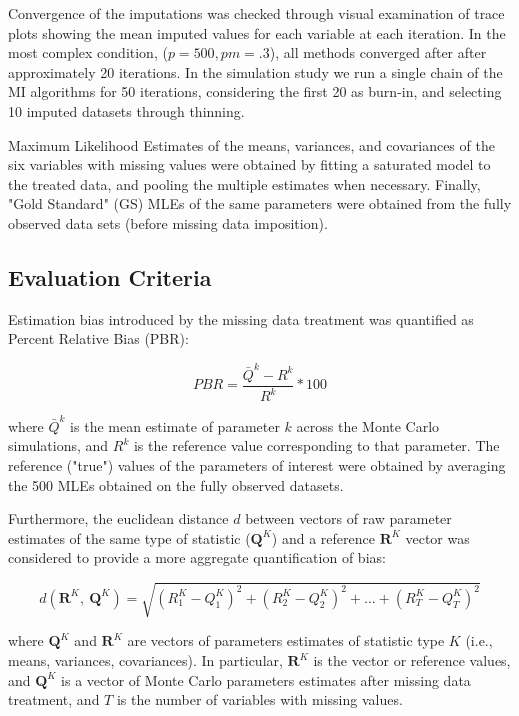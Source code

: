 Convergence of the imputations was checked through visual examination of trace plots showing the mean imputed values
for each variable at each iteration. In the most complex condition, ($p = 500, pm = .3$), all methods converged after 
after approximately 20 iterations. In the simulation study we run a single chain of the MI algorithms for 50 
iterations, considering the first 20 as burn-in, and selecting 10 imputed datasets through thinning.

Maximum Likelihood Estimates of the means, variances, and covariances of the six variables with missing values  
were obtained by fitting a saturated model to the treated data, and pooling the multiple estimates when necessary. 
Finally, "Gold Standard" (GS) MLEs of the same parameters were obtained from the fully observed data sets (before missing data imposition).

\subsection{Evaluation Criteria}

Estimation bias introduced by the missing data treatment was quantified as Percent Relative Bias (PBR):

\begin{equation}
	PBR = \frac{\bar{Q}^{k} - R^{k} }{R^{k}}*100 \label{eq:bias_p}
\end{equation}

where $\bar{Q}^{k}$ is the mean estimate of parameter $k$ across the Monte Carlo simulations, and $R^{k}$ is the 
reference value corresponding to that parameter. The reference ("true") values of the parameters of interest were 
obtained by averaging the 500 MLEs obtained on the fully observed datasets. 

Furthermore, the euclidean distance $d$ between vectors of raw parameter estimates of the same type of statistic 
($\bm{Q}^{K}$) and a reference $\bm{R}^{K}$ vector was considered to provide a more aggregate quantification of bias:

\begin{equation}
	d(\bm{R}^{K}, \: \bm{Q}^{K}) = 
		\sqrt{ 
			(R^{K}_{1} - Q^{K}_{1})^{2} + 
			(R^{K}_{2} - Q^{K}_{2})^{2} + 
			... + 
			(R^{K}_{T} - Q^{K}_{T})^{2}
		} 
			\label{eq:eu_dist}
\end{equation}

where $\bm{Q}^{K}$ and $\bm{R}^{K}$ are vectors of parameters estimates of statistic type $K$ (i.e., means, variances, covariances). 
In particular, $\bm{R}^{K}$ is the vector or reference values, and $\bm{Q}^{K}$ is a vector of Monte Carlo parameters estimates after 
missing data treatment, and $T$ is the number of variables with missing values.

